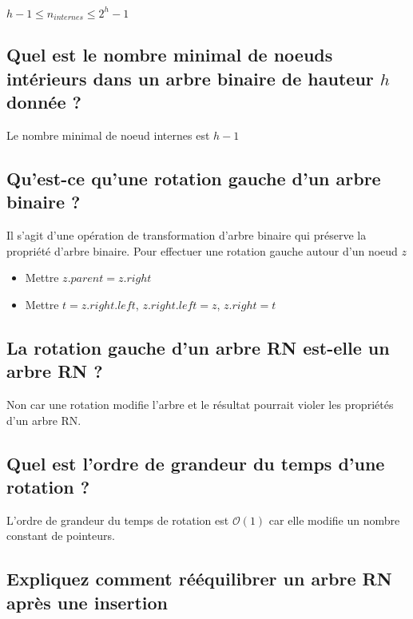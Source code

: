 \documentclass[11pt]{article}
\begin{document}
$h - 1 \leq n_{internes} \leq 2^h - 1$ 

\subsection{Quel est le nombre minimal de noeuds intérieurs dans un arbre binaire de hauteur $h$ donnée ?}

Le nombre minimal de noeud internes est $h - 1$

\subsection{Qu'est-ce qu'une rotation gauche d'un arbre binaire ?}

Il s'agit d'une opération de transformation d'arbre binaire qui préserve la propriété d'arbre binaire.
Pour effectuer une rotation gauche autour d'un noeud $z$

\begin{itemize}
	\item Mettre $z.parent = z.right$
	\item Mettre $t = z.right.left$, $z.right.left = z$, $z.right = t$
\end{itemize} 

\subsection{La rotation gauche d'un arbre RN est-elle un arbre RN ?}

Non car une rotation modifie l'arbre et le résultat pourrait violer les propriétés d'un arbre RN. 

\subsection{Quel est l'ordre de grandeur du temps d'une rotation ?}

L'ordre de grandeur du temps de rotation est $\mathcal{O}(1)$ car elle modifie un nombre constant de pointeurs.

\subsection{Expliquez comment rééquilibrer un arbre RN après une insertion}
\end{document}
